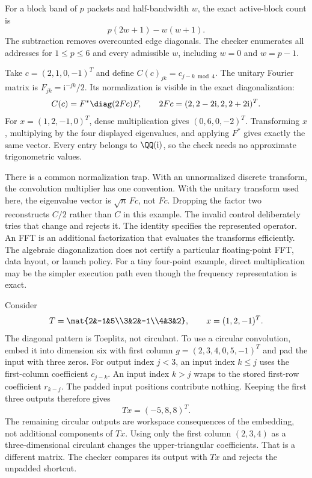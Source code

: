 For a block band of $p$ packets and half-bandwidth $w$, the exact active-block count is
\[
p(2w+1)-w(w+1).
\]
The subtraction removes overcounted edge diagonals. The checker enumerates all addresses for $1\le p\le6$ and every admissible $w$, including $w=0$ and $w=p-1$.

Take $c=(2,1,0,-1)^T$ and define $C(c)_{jk}=c_{j-k\bmod4}$. The unitary Fourier matrix is $F_{jk}=\mathrm i^{-jk}/2$. Its normalization is visible in the exact diagonalization:
\[
C(c)=F^*\diag(2Fc)F,\qquad 2Fc=(2,2-2\mathrm i,2,2+2\mathrm i)^T.
\]
For $x=(1,2,-1,0)^T$, dense multiplication gives $(0,6,0,-2)^T$. Transforming $x$, multiplying by the four displayed eigenvalues, and applying $F^*$ gives exactly the same vector. Every entry belongs to $\QQ(\mathrm i)$, so the check needs no approximate trigonometric values.

There is a common normalization trap. With an unnormalized discrete transform, the convolution multiplier has one convention. With the unitary transform used here, the eigenvalue vector is $\sqrt n\,Fc$, not $Fc$. Dropping the factor two reconstructs $C/2$ rather than $C$ in this example. The invalid control deliberately tries that change and rejects it.
The identity specifies the represented operator. An FFT is an additional factorization that evaluates the transforms efficiently. The algebraic diagonalization does not certify a particular floating-point FFT, data layout, or launch policy. For a tiny four-point example, direct multiplication may be the simpler execution path even though the frequency representation is exact.

Consider
\[
T=\mat{2&-1&5\\3&2&-1\\4&3&2},\qquad x=(1,2,-1)^T.
\]
The diagonal pattern is Toeplitz, not circulant. To use a circular convolution, embed it into dimension six with first column $g=(2,3,4,0,5,-1)^T$ and pad the input with three zeros.
For output index $j<3$, an input index $k\le j$ uses the first-column coefficient $c_{j-k}$. An input index $k>j$ wraps to the stored first-row coefficient $r_{k-j}$. The padded input positions contribute nothing. Keeping the first three outputs therefore gives
\[
Tx=(-5,8,8)^T.
\]
The remaining circular outputs are workspace consequences of the embedding, not additional components of $Tx$.
Using only the first column $(2,3,4)$ as a three-dimensional circulant changes the upper-triangular coefficients. That is a different matrix. The checker compares its output with $Tx$ and rejects the unpadded shortcut.

